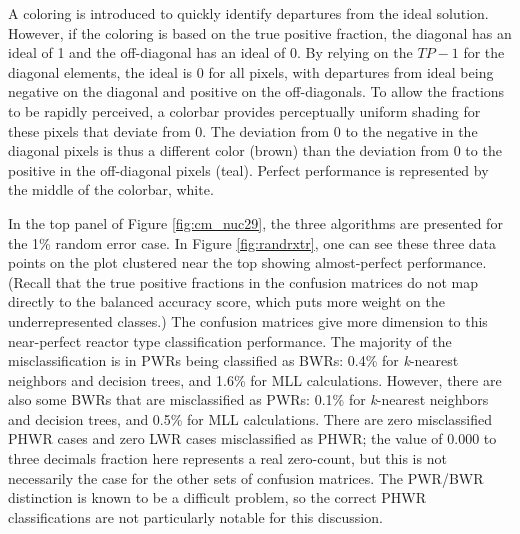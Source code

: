 A coloring is introduced to quickly identify departures from the ideal
solution. However, if the coloring is based on the true positive fraction, the
diagonal has an ideal of 1 and the off-diagonal has an ideal of 0.  By relying
on the $TP - 1$ for the diagonal elements, the ideal is 0 for all pixels, with
departures from ideal being negative on the diagonal and positive on the
off-diagonals.  To allow the fractions to be rapidly perceived, a colorbar
provides perceptually uniform shading for these pixels that deviate from 0.
The deviation from 0 to the negative in the diagonal pixels is thus a different
color (brown) than the deviation from 0 to the positive in the off-diagonal
pixels (teal).  Perfect performance is represented by the middle of the
colorbar, white.  

In the top panel of Figure \ref{fig:cm_nuc29}, the three algorithms are
presented for the 1\% random error case. In Figure \ref{fig:randrxtr}, one can
see these three data points on the plot clustered near the top showing
almost-perfect performance.  (Recall that the true positive fractions in the
confusion matrices do not map directly to the balanced accuracy score, which
puts more weight on the underrepresented classes.) The confusion matrices give
more dimension to this near-perfect reactor type classification performance.
The majority of the misclassification is in \glspl{PWR} being classified as
\glspl{BWR}: 0.4\% for \textit{k}-nearest neighbors and decision trees, and
1.6\% for \gls{MLL} calculations. However, there are also some \glspl{BWR} that
are misclassified as \glspl{PWR}: 0.1\% for \textit{k}-nearest neighbors and
decision trees, and 0.5\% for \gls{MLL} calculations.  There are zero
misclassified \gls{PHWR} cases and zero \gls{LWR} cases misclassified as
\gls{PHWR}; the value of 0.000 to three decimals fraction here represents a
real zero-count, but this is not necessarily the case for the other sets of
confusion matrices.  The \gls{PWR}/\gls{BWR} distinction 
is known to be a difficult problem, so the correct \gls{PHWR} classifications
are not particularly notable for this discussion. 

